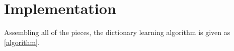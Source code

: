\documentclass{article}
\begin{document}


\section{Implementation}

Assembling all of the pieces, the dictionary learning algorithm is given as \autoref{algorithm}.
\end{document}
